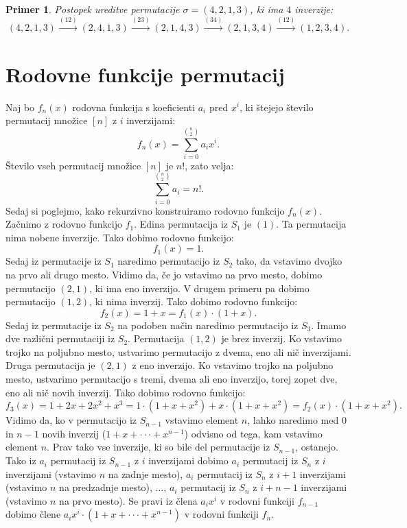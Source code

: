 \documentclass[a4paper, 12pt]{book}
\newtheorem{primer}{Primer}[chapter]
\begin{document}
\begin{primer}
    Postopek ureditve permutacije $\sigma = (4, 2, 1, 3)$, ki ima $4$ inverzije: 
    \[
        (4, 2, 1, 3) \overset{(12)}{\rightarrow} (2, 4, 1, 3) \overset{(23)}{\rightarrow} (2, 1, 4, 3) \overset{(34)}{\rightarrow} (2, 1, 3, 4) \overset{(12)}{\rightarrow} (1, 2, 3, 4).
    \]
\end{primer}

\section{ Rodovne funkcije permutacij }
Naj bo $f_n(x)$ rodovna funkcija s koeficienti $a_i$ pred $x^i$, ki štejejo število permutacij množice $[n]$ z $i$ inverzijami:
\[
    f_n(x) = \sum_{i=0}^{\binom{n}{2}} a_i x^i.
\]
Število vseh permutacij množice $[n]$ je $n!$, zato velja:
\[
    \sum_{i=0}^{\binom{n}{2}} a_i = n! .
\]
Sedaj si poglejmo, kako rekurzivno konstruiramo rodovno funkcijo $f_n(x)$. Začnimo z rodovno funkcijo $f_1$. Edina permutacija iz $S_1$ je $(1)$. Ta permutacija nima nobene inverzije. Tako dobimo rodovno funkcijo:
\[
    f_1(x) = 1.
\]
Sedaj iz permutacije iz $S_1$ naredimo permutacijo iz $S_2$ tako, da vstavimo dvojko na prvo ali drugo mesto. Vidimo da, če jo vstavimo na prvo mesto, dobimo permutacijo $(2, 1)$, ki ima eno inverzijo. V drugem primeru pa dobimo permutacijo $(1, 2)$, ki nima inverzij. Tako dobimo rodovno funkcijo:
\[
    f_2(x) = 1 + x = f_1(x) \cdot (1 + x).
\]
Sedaj iz permutacije iz $S_2$ na podoben način naredimo permutacijo iz $S_3$. Imamo dve različni permutaciji iz $S_2$. Permutacija $(1, 2)$ je brez inverzij. Ko vstavimo trojko na poljubno mesto, ustvarimo permutacijo z dvema, eno ali nič inverzijami. Druga permutacija je $(2, 1)$ z eno inverzijo. Ko vstavimo trojko na poljubno mesto, ustvarimo permutacijo s tremi, dvema ali eno inverzijo, torej zopet dve, eno ali nič novih inverzij. Tako dobimo rodovno funkcijo:
\[
    f_3(x) = 1 + 2x + 2x^2 + x^3 = 1 \cdot (1 + x + x^2) + x \cdot (1 + x + x^2) = f_2(x) \cdot (1 + x + x^2).
\]
Vidimo da, ko v permutacijo iz $S_{n-1}$ vstavimo element $n$, lahko naredimo med $0$ in $n-1$ novih inverzij ($1 + x + \cdot\cdot\cdot + x^{n-1}$) odvisno od tega, kam vstavimo element $n$. Prav tako vse inverzije, ki so bile del permutacije iz $S_{n-1}$, ostanejo. Tako iz $a_i$ permutacij iz $S_{n-1}$ z $i$ inverzijami dobimo $a_i$ permutacij iz $S_n$ z $i$ inverzijami (vstavimo $n$ na zadnje mesto), $a_i$ permutacij iz $S_n$ z $i+1$ inverzijami (vstavimo $n$ na predzadnje mesto), $\dots$, $a_i$ permutacij iz $S_n$ z $i+n-1$ inverzijami (vstavimo $n$ na prvo mesto). Se pravi iz člena $a_i x^i$ v rodovni funkciji $f_{n-1}$ dobimo člene $a_i x^i \cdot (1 + x + \cdot\cdot\cdot + x^{n-1})$ v rodovni funkciji $f_n$.
\end{document}
